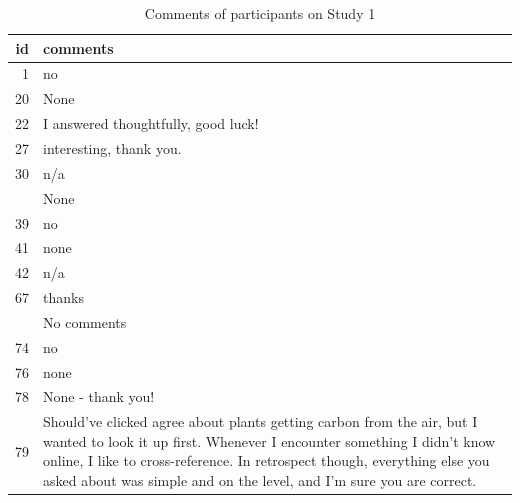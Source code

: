 \documentclass[
  doc,floatsintext]{apa6}
\begin{document}
\begin{longtable}[t]{>{}r>{\raggedright\arraybackslash}p{40em}}
\caption{\label{tab:unnamed-chunk-52}Comments of participants on Study 1}\\
\toprule
id & comments\\
\midrule
1 & no\\
20 & None\\
22 & I answered thoughtfully, good luck!\\
27 & interesting, thank you.\\
30 & n/a\\
\addlinespace
32 & None\\
39 & no\\
41 & none\\
42 & n/a\\
67 & thanks\\
\addlinespace
69 & No comments\\
74 & no\\
76 & none\\
78 & None - thank you!\\
79 & Should've clicked agree about plants getting carbon from the air, but I wanted to look it up first. Whenever I encounter something I didn't know online, I like to cross-reference. In retrospect though, everything else you asked about was simple and on the level, and I'm sure you are correct.


\end{longtable}
\end{document}
